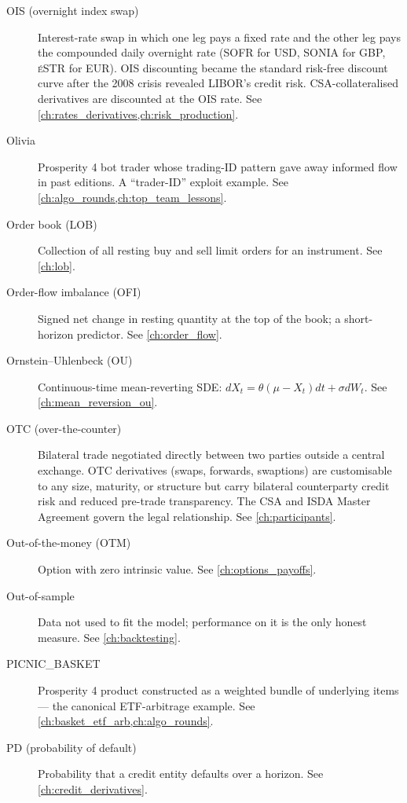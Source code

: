 \begin{description}
\item[OIS (overnight index swap)]
Interest-rate swap in which one leg pays a fixed rate and the other leg
pays the compounded daily overnight rate (SOFR for USD, SONIA for GBP,
\textsc{\'e}STR for EUR). OIS discounting became the standard risk-free
discount curve after the 2008 crisis revealed LIBOR's credit risk.
CSA-collateralised derivatives are discounted at the OIS rate.
See \cref{ch:rates_derivatives,ch:risk_production}.

\item[Olivia]
Prosperity 4 bot trader whose trading-ID pattern gave away informed
flow in past editions. A ``trader-ID'' exploit example. See \cref{ch:algo_rounds,ch:top_team_lessons}.

\item[Order book (LOB)]
Collection of all resting buy and sell limit orders for an instrument.
See \cref{ch:lob}.

\item[Order-flow imbalance (OFI)]
Signed net change in resting quantity at the top of the book; a
short-horizon predictor. See \cref{ch:order_flow}.

\item[Ornstein--Uhlenbeck (OU)]
Continuous-time mean-reverting SDE: $dX_t = \theta(\mu-X_t)dt + \sigma
dW_t$. See \cref{ch:mean_reversion_ou}.

\item[OTC (over-the-counter)]
Bilateral trade negotiated directly between two parties outside a
central exchange. OTC derivatives (swaps, forwards, swaptions) are
customisable to any size, maturity, or structure but carry bilateral
counterparty credit risk and reduced pre-trade transparency. The CSA
and ISDA Master Agreement govern the legal relationship.
See \cref{ch:participants}.

\item[Out-of-the-money (OTM)]
Option with zero intrinsic value. See \cref{ch:options_payoffs}.

\item[Out-of-sample]
Data not used to fit the model; performance on it is the only honest
measure. See \cref{ch:backtesting}.

\item[PICNIC\_BASKET]
Prosperity 4 product constructed as a weighted bundle of underlying
items --- the canonical ETF-arbitrage example. See \cref{ch:basket_etf_arb,ch:algo_rounds}.

\item[PD (probability of default)]
Probability that a credit entity defaults over a horizon. See \cref{ch:credit_derivatives}.


\end{description}
